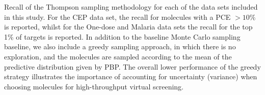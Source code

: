 Recall of the Thompson sampling methodology for each of the data sets included in this study. For the CEP data set, the recall for molecules with a PCE $>10\%$ is reported, whilst for the One-dose and Malaria data sets the recall for the top 1\% of targets is reported. In addition to the baseline Monte Carlo sampling baseline, we also include a greedy sampling approach, in which there is no exploration, and the molecules are sampled according to the mean of the predictive distribution given by PBP.  The overall lower performance of the greedy strategy illustrates the importance of accounting for uncertainty (variance) when choosing molecules for high-throughput virtual screening.\label{fig:thompson_1pc}